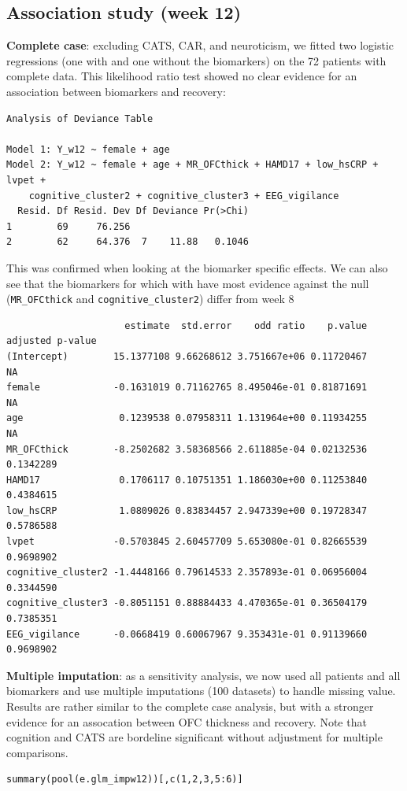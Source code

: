 \documentclass[12pt]{article}
\begin{document}
\subsection{Association study (week 12)}
\label{sec:org90e18de}

\textbf{Complete case}: excluding CATS, CAR, and neuroticism, we fitted two
logistic regressions (one with and one without the biomarkers) on the
72 patients with complete data. This likelihood ratio test showed no
clear evidence for an association between biomarkers and recovery:
\begin{verbatim}
Analysis of Deviance Table

Model 1: Y_w12 ~ female + age
Model 2: Y_w12 ~ female + age + MR_OFCthick + HAMD17 + low_hsCRP + lvpet + 
    cognitive_cluster2 + cognitive_cluster3 + EEG_vigilance
  Resid. Df Resid. Dev Df Deviance Pr(>Chi)
1        69     76.256                     
2        62     64.376  7    11.88   0.1046
\end{verbatim}


This was confirmed when looking at the biomarker specific effects. We
can also see that the biomarkers for which with have most evidence
against the null (\texttt{MR\_OFCthick} and \texttt{cognitive\_cluster2}) differ from
week 8
\begin{verbatim}
                     estimate  std.error    odd ratio    p.value adjusted p-value
(Intercept)        15.1377108 9.66268612 3.751667e+06 0.11720467               NA
female             -0.1631019 0.71162765 8.495046e-01 0.81871691               NA
age                 0.1239538 0.07958311 1.131964e+00 0.11934255               NA
MR_OFCthick        -8.2502682 3.58368566 2.611885e-04 0.02132536        0.1342289
HAMD17              0.1706117 0.10751351 1.186030e+00 0.11253840        0.4384615
low_hsCRP           1.0809026 0.83834457 2.947339e+00 0.19728347        0.5786588
lvpet              -0.5703845 2.60457709 5.653080e-01 0.82665539        0.9698902
cognitive_cluster2 -1.4448166 0.79614533 2.357893e-01 0.06956004        0.3344590
cognitive_cluster3 -0.8051151 0.88884433 4.470365e-01 0.36504179        0.7385351
EEG_vigilance      -0.0668419 0.60067967 9.353431e-01 0.91139660        0.9698902
\end{verbatim}

\textbf{Multiple imputation}: as a sensitivity analysis, we now used all
patients and all biomarkers and use multiple imputations (100
datasets) to handle missing value. Results are rather similar to the
complete case analysis, but with a stronger evidence for an assocation
between OFC thickness and recovery. Note that cognition and CATS are
bordeline significant without adjustment for multiple comparisons.
\lstset{language=r,label= ,caption= ,captionpos=b,numbers=none}
\begin{lstlisting}
summary(pool(e.glm_impw12))[,c(1,2,3,5:6)]
\end{lstlisting}
\end{document}
